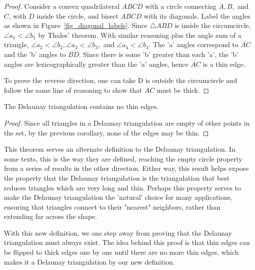 \begin{proof}
	Consider a convex quadrilateral $ABCD$ with a circle connecting $A, B,$ and $C$, with $D$ inside the circle, and bisect $ABCD$ with its diagonals.
	Label the angles as shown in Figure~\ref{fig_diagonal_labels}.
	Since $\triangle ABD$ is inside the circumcircle, $\angle a_1 < \angle b_1$ by Thales' theorem.
	With similar reasoning plus the angle sum of a triangle, $\angle a_2 < \angle b_2, \angle a_3 < \angle b_3,$ and $\angle a_4 < \angle b_4$.
	The 'a' angles correspond to $\overline{AC}$ and the 'b' angles to $\overline{BD}$.
	Since there is some 'b' greater than each 'a', the 'b' angles are lexicographically greater than the 'a' angles, hence $\overline{AC}$ is a thin edge.

	To prove the reverse direction, one can take D is outside the circumcircle and follow the same line of reasoning to show that $\overline{AC}$ must be thick.
\end{proof}

\begin{lemma}
	The Delaunay triangulation contains no thin edges.
\end{lemma}
\begin{proof}
	Since all triangles in a Delaunay triangulation are empty of other points in the set, by the previous corollary, none of the edges may be thin.
\end{proof}

This theorem serves an alternate definition to the Delaunay triangulation.
In some texts, this is the way they are defined, reaching the empty circle property from a series of results in the other direction.
Either way, this result helps expose the property that the Delaunay triangulation is the triangulation that best reduces triangles which are very long and thin.
Perhaps this property serves to make the Delaunay triangulation the 'natural' choice for many applications, ensuring that triangles connect to their "nearest" neighbors, rather than extending far across the shape.

With this new definition, we one step away from proving that the Delaunay triangulation must always exist.
The idea behind this proof is that thin edges can be flipped to thick edges one by one until there are no more thin edges, which makes it a Delaunay triangulation by our new definition.

